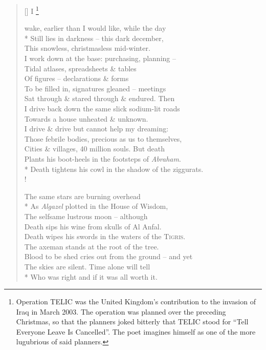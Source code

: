 \documentclass[openany]{amsbook}
\newcommand\blfootnote[1]{%
    \begingroup
    \renewcommand\thefootnote{}\footnote{#1}%
    \addtocounter{footnote}{-1}%
    \endgroup
}
\begin{document}
\settowidth{\versewidth}{I wake, earlier than I would like, while the day}
\begin{verse}[\versewidth]
    I\blfootnote{Operation TELIC was the United Kingdom's contribution to the invasion of Iraq in March 2003. The operation was planned over the preceding Christmas, so that the planners joked bitterly that TELIC stood for ``Tell Everyone Leave Is Cancelled''. The poet imagines himself as one of the more lugubrious of said planners.} wake, earlier than I would like, while the day\\*
    Still lies in darkness -- this dark december,\\
    This snowless, christmasless mid-winter.\\
    I work down at the base: purchasing, planning --\\
    Tidal atlases, spreadsheets \& tables\\
    Of figures -- declarations \& forms\\
    To be filled in, signatures gleaned -- meetings\\
    Sat through \& stared through \& endured. Then\\
    I drive back down the same slick sodium-lit roads\\
    Towards a house unheated \& unknown.\\
    I drive \& drive but cannot help my dreaming:\\
    Those febrile bodies, precious as us to themselves,\\
    Cities \& villages, 40 million souls. But death\\
    Plants his boot-heels in the footsteps of \textit{Abraham}.\\*
    Death tightens his cowl in the shadow of the ziggurats.\\!

    The same stars are burning overhead\\*
    As \textit{Algazel} plotted in the House of Wisdom,\\
    The selfsame lustrous moon -- although\\
    Death sips his wine from skulls of Al Anfal.\\
    Death wipes his swords in the waters of the \textsc{Tigris}.\\
    The axeman stands at the root of the tree.\\
    Blood to be shed cries out from the ground -- and yet\\
    The skies are silent. Time alone will tell\\*
    Who was right and if it was all worth it.
\end{verse}
\end{document}

